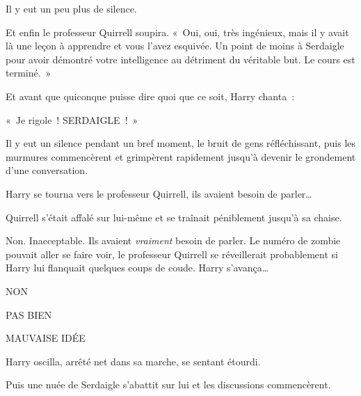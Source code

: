 Il y eut un peu plus de silence.

Et enfin le professeur Quirrell soupira. «~Oui, oui, très ingénieux, mais il y avait là une leçon à apprendre et vous l'avez esquivée. Un point de moins à Serdaigle pour avoir démontré votre intelligence au détriment du véritable but. Le cours est terminé.~»

Et avant que quiconque puisse dire quoi que ce soit, Harry chanta~:

«~Je rigole~! SERDAIGLE~!~»

Il y eut un silence pendant un bref moment, le bruit de gens réfléchissant, puis les murmures commencèrent et grimpèrent rapidement jusqu'à devenir le grondement d'une conversation.

Harry se tourna vers le professeur Quirrell, ils avaient besoin de parler…

Quirrell s'était affalé sur lui-même et se traînait péniblement jusqu'à sa chaise.

Non. Inacceptable. Ils avaient \emph{vraiment} besoin de parler. Le numéro de zombie pouvait aller se faire voir, le professeur Quirrell se réveillerait probablement si Harry lui flanquait quelques coups de coude. Harry s'avança…

NON

PAS BIEN

MAUVAISE IDÉE

Harry oscilla, arrêté net dans sa marche, se sentant étourdi.

Puis une nuée de Serdaigle s'abattit sur lui et les discussions commencèrent.~
